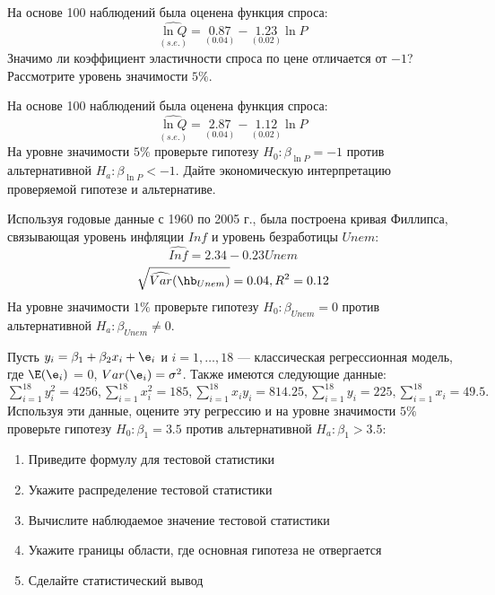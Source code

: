 \documentclass[pdftex,11pt,openany]{book}\usepackage[]{graphicx}\usepackage[]{color}
\begin{document}
\begin{solution}
\end{solution}


\begin{problem} На основе 100 наблюдений была оценена функция спроса:
\[
\underset{(s.e.)}{\widehat{\ln Q}} = \underset{(0.04)}{0.87} - \underset{(0.02)}{1.23}\ln P
\]
Значимо ли коэффициент эластичности спроса по цене отличается от $-1$? Рассмотрите уровень значимости $5\%$.
\end{problem}

\begin{solution}
\end{solution}


\begin{problem}
 На основе 100 наблюдений была оценена функция спроса:
\[
\underset{(s.e.)}{\widehat{\ln Q}} = \underset{(0.04)}{2.87} - \underset{(0.02)}{1.12}\ln P
\]
На уровне значимости $5\%$ проверьте гипотезу  $H_0: \beta_{\ln P} = - 1$ против альтернативной $H_a: \beta_{\ln P} < -1$. Дайте экономическую интерпретацию проверяемой гипотезе и альтернативе.
\end{problem}

\begin{solution}
\end{solution}


\begin{problem}
 Используя годовые данные с 1960 по 2005 г., была построена кривая Филлипса, связывающая уровень инфляции $Inf$ и уровень безработицы $Unem$:
\[
\widehat{Inf} = 2.34 - 0.23Unem
\]
\[
\sqrt{\widehat{Var}(\hb_{Unem})} = 0.04, R^2 = 0.12
\]
На уровне значимости $1\%$ проверьте гипотезу  $H_0: \beta_{Unem} = 0$ против альтернативной $H_a: \beta_{Unem} \not= 0$.
\end{problem}

\begin{solution}
\end{solution}


\begin{problem}
 Пусть $y_i = \beta_1 + \beta_2 x_i + \e_i$ и $i = 1, \dots, 18$ --- классическая регрессионная модель, где $\E(\e_i)$ = 0, $Var(\e_i) = \sigma^2$. Также имеются следующие данные: $\sum_{i=1}^{18} y_i^2 = 4256, \sum_{i=1}^{18} x_i^2 = 185, \sum_{i=1}^{18} x_iy_i = 814.25, \sum_{i=1}^{18} y_i = 225, \sum_{i=1}^{18} x_i = 49.5.$ Используя эти данные, оцените эту регрессию и на уровне значимости $5\%$ проверьте гипотезу $H_0: \beta_1 = 3.5$ против альтернативной $H_a: \beta_1 > 3.5$:
\begin{enumerate}
\item Приведите формулу для тестовой статистики
\item Укажите распределение тестовой статистики
\item Вычислите наблюдаемое значение тестовой статистики
\item Укажите границы области, где основная гипотеза не отвергается
\item Сделайте статистический вывод
\end{enumerate}
\end{problem}
\end{document}
